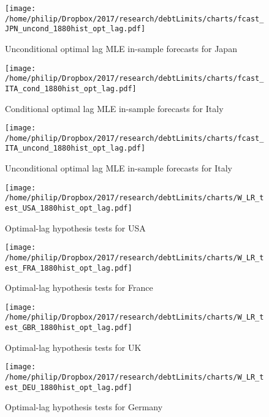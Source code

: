 \documentclass{article}
\begin{document}
	\begin{figure}[htbp]
	    \centering
		\texttt{[image: /home/philip/Dropbox/2017/research/debtLimits/charts/fcast\_JPN\_uncond\_1880hist\_opt\_lag.pdf]}
		\caption{Unconditional optimal lag MLE in-sample forecasts for Japan}
	\end{figure}

	\begin{figure}[htbp]
	    \centering
		\texttt{[image: /home/philip/Dropbox/2017/research/debtLimits/charts/fcast\_ITA\_cond\_1880hist\_opt\_lag.pdf]}
		\caption{Conditional optimal lag MLE in-sample forecasts for Italy}
	\end{figure}
	
	\begin{figure}[htbp]
	    \centering
		\texttt{[image: /home/philip/Dropbox/2017/research/debtLimits/charts/fcast\_ITA\_uncond\_1880hist\_opt\_lag.pdf]}
		\caption{Unconditional optimal lag MLE in-sample forecasts for Italy}
	\end{figure}




	\newpage

	\begin{figure}[htbp]
	    \centering
		\texttt{[image: /home/philip/Dropbox/2017/research/debtLimits/charts/W\_LR\_test\_USA\_1880hist\_opt\_lag.pdf]}
		\caption{Optimal-lag hypothesis tests for USA}
	\end{figure}
	
	\begin{figure}[htbp]
	    \centering
		\texttt{[image: /home/philip/Dropbox/2017/research/debtLimits/charts/W\_LR\_test\_FRA\_1880hist\_opt\_lag.pdf]}
		\caption{Optimal-lag hypothesis tests for France}
	\end{figure}
	
	\begin{figure}[htbp]
	    \centering
		\texttt{[image: /home/philip/Dropbox/2017/research/debtLimits/charts/W\_LR\_test\_GBR\_1880hist\_opt\_lag.pdf]}
		\caption{Optimal-lag hypothesis tests for UK}
	\end{figure}

	\begin{figure}[htbp]
	    \centering
		\texttt{[image: /home/philip/Dropbox/2017/research/debtLimits/charts/W\_LR\_test\_DEU\_1880hist\_opt\_lag.pdf]}
		\caption{Optimal-lag hypothesis tests for Germany}
	\end{figure}
\end{document}
